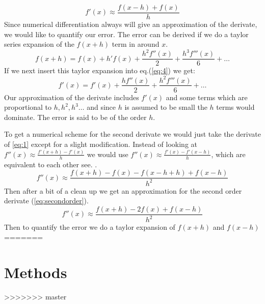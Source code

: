 \begin{equation}\label{eq:5}
  f'(x) \approx \frac{f(x-h)+f(x)}{h}
\end{equation}
Since numerical differentiation always will give an approximation of the
derivate, we would like to quantify our error. The error can be derived
if we do a taylor series expansion of the $f(x+h)$ term in around $x$.
\begin{equation}\label{eq:4}
    f(x+h) = f(x) + h'f(x) + \frac{h^2f''(x)}{2} + \frac{h^3f'''(x)}{6} + \dots
\end{equation}
If we next insert this taylor expansion into eq.(\ref{eq:4}) we get:
\begin{equation}
  f'(x) = f'(x) + \frac{h f''(x)}{2} + \frac{h^2f'''(x)}{6} + \dots
\end{equation}
Our approximation of the derivate includes $f'(x)$ and some terms which are
proportional to $h, h^2, h^3 \dots $ and since $h$ is assumed to be small the
$h$ terms would dominate. The error is said to be of the order $h$.
\par
To get a numerical scheme for the second derivate we would just take the
derivate of \cref{eq:1} except for a slight modification. Instead of looking at $f''(x) \approx \frac{f'(x+h)-f'(x)}{h}$ we would use
$f''(x) \approx\frac{f'(x)-f'(x-h)}{h}$, which are equivalent to each other
see. \cite{mathexh}.
\begin{equation}
  f''(x) \approx \frac{f(x + h) - f(x) -f(x-h+h) +f(x-h)}{h^2}
\end{equation}
Then after a bit of a clean up we get an approximation for the second order
derivate (\cref{eq:secondorder}).
\begin{equation}\label{eq:secondorder}
  f''(x) \approx \frac{f(x+h)-2f(x) + f(x-h)}{h^2}
\end{equation}
Then to quantify the error we do a taylor expansion of $f(x+h)$ and $f(x-h)$
=======
\section*{Methods}
>>>>>>> master

